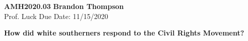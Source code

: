 \noindent
\textbf{AMH2020.03} \hfill \textbf{Brandon Thompson} \\
\normalsize Prof. Luck \hfill Due Date: 11/15/2020 \\

\begin{center}
\textbf{How did white southerners respond to the Civil Rights Movement?}
\end{center}